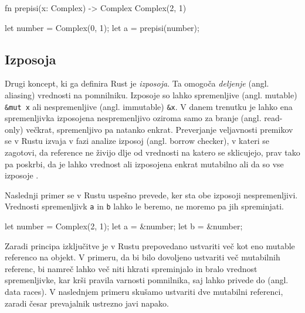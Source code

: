 \begin{rust-success}
fn prepisi(x: Complex) -> Complex { Complex(2, 1) }

let number = Complex(0, 1);
let a = prepisi(number);
\end{rust-success}


\subsection{Izposoja}

Drugi koncept, ki ga definira Rust je \textit{izposoja}. Ta omogoča \textit{deljenje} (angl. aliasing) vrednosti na pomnilniku. Izposoje so lahko spremenljive (angl. mutable) \texttt{\&mut x} ali nespremenljive (angl. immutable) \texttt{\&x}. V danem trenutku je lahko ena spremenljivka izposojena nespremenljivo oziroma samo za branje (angl. read-only) večkrat, spremenljivo pa natanko enkrat. Preverjanje veljavnosti premikov se v Rustu izvaja v fazi analize izposoj (angl. borrow checker), v kateri se zagotovi, da reference ne živijo dlje od vrednosti na katero se sklicujejo, prav tako pa poskrbi, da je lahko vrednost ali izposojena enkrat mutabilno ali da so vse izposoje .

Naslednji primer se v Rustu uspešno prevede, ker sta obe izposoji nespremenljivi. Vrednosti spremenljivk \texttt{a} in \texttt{b} lahko le beremo, ne moremo pa jih spreminjati.

\begin{rust-success}
let number = Complex(2, 1);
let a = &number;
let b = &number;
\end{rust-success}

Zaradi principa izključitve je v Rustu prepovedano ustvariti več kot eno mutable referenco na objekt. V primeru, da bi bilo dovoljeno ustvariti več mutabilnih referenc, bi namreč lahko več niti hkrati spreminjalo in bralo vrednost spremenljivke, kar krši pravila varnosti pomnilnika, saj lahko privede do  (angl. data races). V naslednjem primeru skušamo ustvariti dve mutabilni referenci, zaradi česar prevajalnik ustrezno javi napako.


